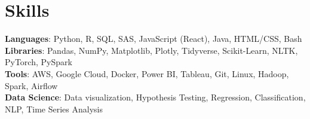 \section{Skills}
 \begin{itemize}[leftmargin=0.15in, label={}]
    \small{\item{
     \textbf{Languages}{: Python, R, SQL, SAS, JavaScript (React), Java, HTML/CSS, Bash} \\
     \textbf{Libraries}{: Pandas, NumPy, Matplotlib, Plotly, Tidyverse, Scikit-Learn, NLTK, PyTorch, PySpark}\\
     \textbf{Tools}{: AWS, Google Cloud, Docker, Power BI, Tableau, Git, Linux, Hadoop, Spark, Airflow}\\
     \textbf{Data Science}{: Data visualization, Hypothesis Testing, Regression, Classification, NLP, Time Series Analysis}\\
    }}
 \end{itemize}